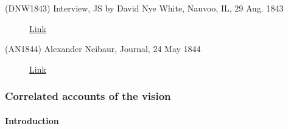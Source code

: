\begin{description}
			\item[(DNW1843) Interview, JS by David Nye White, Nauvoo, IL, 29 Aug. 1843]
				\href{https://www.josephsmithpapers.org/paper-summary/interview-29-august-1843-extract/1}{Link}
				
			\item[(AN1844) Alexander Neibaur, Journal, 24 May 1844]
				\href{https://www.josephsmithpapers.org/paper-summary/alexander-neibaur-journal-24-may-1844-extract/1}{Link}
		
		\end{description}
	
	\subsubsection{Correlated accounts of the vision}
	
		\paragraph{Introduction}
		

